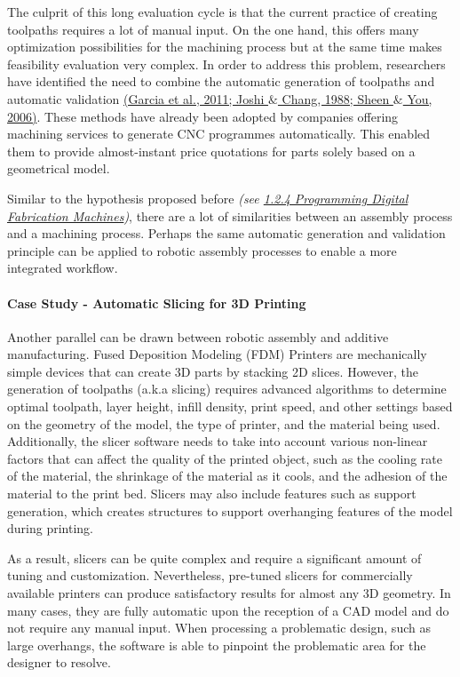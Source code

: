 \documentclass[11pt]{book}
\begin{document}
The culprit of this long evaluation cycle is that the current practice of creating toolpaths requires a lot of manual input. On the one hand, this offers many optimization possibilities for the machining process but at the same time makes feasibility evaluation very complex. In order to address this problem, researchers have identified the need to combine the automatic generation of toolpaths and automatic validation \href{https://www.zotero.org/google-docs/?2C1b7u}{(Garcia et al., 2011; Joshi $\&$ Chang, 1988; Sheen $\&$ You, 2006)}. These methods have already been adopted by companies offering machining services to generate CNC programmes automatically. This enabled them to provide almost-instant price quotations for parts solely based on a geometrical model. 

\begin{flushleft}
Similar to the hypothesis proposed before \textit{(see \uline{1.2.4 Programming Digital Fabrication Machines})}, there are a lot of similarities between an assembly process and a machining process. Perhaps the same automatic generation and validation principle can be applied to robotic assembly processes to enable a more integrated workflow.
\end{flushleft}


\paragraph{Case Study - Automatic Slicing for 3D Printing}

Another parallel can be drawn between robotic assembly and additive manufacturing. Fused Deposition Modeling (FDM) Printers are mechanically simple devices that can create 3D parts by stacking 2D slices. However, the generation of toolpaths (a.k.a slicing) requires advanced algorithms to determine optimal toolpath, layer height, infill density, print speed, and other settings based on the geometry of the model, the type of printer, and the material being used. Additionally, the slicer software needs to take into account various non-linear factors that can affect the quality of the printed object, such as the cooling rate of the material, the shrinkage of the material as it cools, and the adhesion of the material to the print bed. Slicers may also include features such as support generation, which creates structures to support overhanging features of the model during printing. 

As a result, slicers can be quite complex and require a significant amount of tuning and customization. Nevertheless, pre-tuned slicers for commercially available printers can produce satisfactory results for almost any 3D geometry. In many cases, they are fully automatic upon the reception of a CAD model and do not require any manual input. When processing a problematic design, such as large overhangs, the software is able to pinpoint the problematic area for the designer to resolve. 
\end{document}
